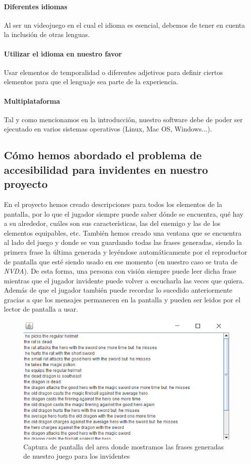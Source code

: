 	\paragraph{Diferentes idiomas} Al ser un videojuego en el cual el idioma es esencial, debemos de tener en cuenta la inclusión de otras lenguas.
  \paragraph{Utilizar el idioma en nuestro favor} Usar elementos de temporalidad o diferentes adjetivos para definir ciertos elementos para que el lenguaje sea parte de la experiencia.
	\paragraph{Multiplataforma} Tal y como mencionamos en la introducción, nuestro software debe de poder ser ejecutado en varios sistemas operativos (Linux, Mac OS, Windows...).
	
\subsection{Cómo hemos abordado el problema de accesibilidad para invidentes en nuestro proyecto}

En el proyecto hemos creado descripciones para todos los elementos de la pantalla, por lo que el jugador siempre puede saber dónde se encuentra, qué hay a su alrededor, cuáles son sus características, las del enemigo y las de los elementos equipables, etc. También hemos creado una ventana que se encuentra al lado del juego y donde se van guardando todas las frases generadas, siendo la primera frase la última generada y leyéndose automáticamente por el reproductor de pantalla que esté siendo usado en ese momento (en nuestro caso se trata de \textit{NVDA}). De esta forma, una persona con visión siempre puede leer dicha frase mientras que el jugador invidente puede volver a escucharla las veces que quiera. Además de que el jugador también puede recordar lo sucedido anteriormente gracias a que los mensajes permanecen en la pantalla y pueden ser leidos por el lector de pantalla a usar.

\begin{figure}[H]
		\includegraphics[width=\textwidth,height=\textheight,keepaspectratio]{./img/roomsGameTextArea.png}
	\caption{Captura de pantalla del area donde mostramos las frases generadas de nuestro juego para los invidentes}
	\label{fig:roomsgametextarea}
\end{figure}

